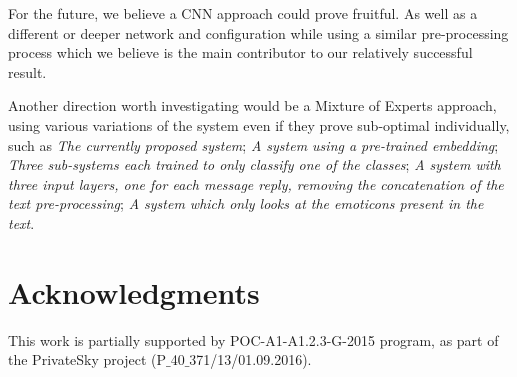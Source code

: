 \documentclass[11pt,a4paper]{article}
\begin{document}
For the future, we believe a CNN approach could prove fruitful. As well as a different or deeper network and configuration while using a similar pre-processing process which we believe is the main contributor to our relatively successful result.

Another direction worth investigating would be a Mixture of Experts approach, using various variations of the system even if they prove sub-optimal individually, such as \textit{The currently proposed system}; \textit{A system using a pre-trained embedding}; \textit{Three sub-systems each trained to only classify one of the classes}; \textit{A system with three input layers, one for each message reply, removing the concatenation of the text pre-processing}; \textit{A system which only looks at the emoticons present in the text}.

\section*{Acknowledgments}

This work is partially supported by POC-A1-A1.2.3-G-2015 program, as part of the PrivateSky project (P$\_$40$\_$371/13/01.09.2016).






\nocite{*}
\printbibliography
\end{document}
